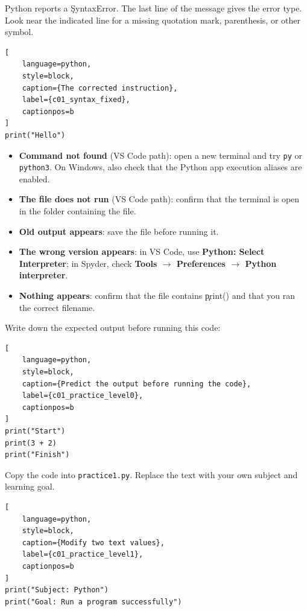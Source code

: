 Python reports a \c{SyntaxError}. The last line of the message gives the error
type. Look near the indicated line for a missing quotation mark, parenthesis,
or other symbol.

\begin{lstlisting}[
    language=python,
    style=block,
    caption={The corrected instruction},
    label={c01_syntax_fixed},
    captionpos=b
]
print("Hello")
\end{lstlisting}


\begin{itemize}
    \item \textbf{Command not found} (VS Code path): open a new terminal and
          try \texttt{py} or \texttt{python3}. On Windows, also check that the
          Python app execution aliases are enabled.
    \item \textbf{The file does not run} (VS Code path): confirm that the
          terminal is open in the folder containing the file.
    \item \textbf{Old output appears}: save the file before running it.
    \item \textbf{The wrong version appears}: in VS Code, use
          \textbf{Python: Select Interpreter}; in Spyder, check
          \textbf{Tools $\rightarrow$ Preferences $\rightarrow$ Python
          interpreter}.
    \item \textbf{Nothing appears}: confirm that the file contains \c{print()}
          and that you ran the correct filename.
\end{itemize}



Write down the expected output before running this code:

\begin{lstlisting}[
    language=python,
    style=block,
    caption={Predict the output before running the code},
    label={c01_practice_level0},
    captionpos=b
]
print("Start")
print(3 + 2)
print("Finish")
\end{lstlisting}


Copy the code into \texttt{practice1.py}. Replace the text with your own
subject and learning goal.

\begin{lstlisting}[
    language=python,
    style=block,
    caption={Modify two text values},
    label={c01_practice_level1},
    captionpos=b
]
print("Subject: Python")
print("Goal: Run a program successfully")
\end{lstlisting}


